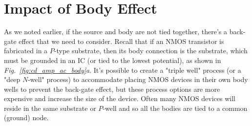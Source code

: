 \section{Impact of Body Effect}
As we noted earlier, if the source and body are not tied together, there's a back-gate effect that we need to consider.  Recall that if an NMOS transistor is fabricated in a $P$-type substrate, then its body connection is the substrate, which must be grounded in an IC (or tied to the lowest potential), as shown in \emph{Fig.~\ref{fig:cd_amp_ac_body}a}.  It's possible to create a "triple well" process (or a "deep $N$-well" process) to accommodate placing NMOS devices in their own body wells to prevent the back-gate effect, but these process options are more expensive and increase the size of the device.  Often many NMOS devices will reside in the same substrate or $P$-well and so all the bodies are tied to a common (ground) node.

